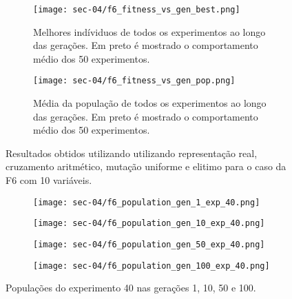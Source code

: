 \begin{figure}[htb]
	\begin{subfigure}{.45\textwidth}
		\centering
		\texttt{[image: sec-04/f6\_fitness\_vs\_gen\_best.png]}
		\caption{Melhores indíviduos de todos os experimentos ao longo das gerações.
		Em preto é mostrado o comportamento médio dos 50 experimentos. }
	\end{subfigure}
	\hfill
	\begin{subfigure}{.45\textwidth}
		\centering
		\texttt{[image: sec-04/f6\_fitness\_vs\_gen\_pop.png]}
		\caption{Média da população de todos os experimentos ao longo das gerações.
		Em preto é mostrado o comportamento médio dos 50 experimentos.}
	\end{subfigure}
	\caption{Resultados obtidos utilizando utilizando representação real, cruzamento aritmético,
    mutação uniforme e elitimo para o caso da F6 com 10 variáveis.}
\end{figure}

\begin{figure}[htb]
	\begin{subfigure}{.5\textwidth}
		\centering
		\texttt{[image: sec-04/f6\_population\_gen\_1\_exp\_40.png]}
	  \end{subfigure}
	  \begin{subfigure}{.5\textwidth}
		\centering
		\texttt{[image: sec-04/f6\_population\_gen\_10\_exp\_40.png]}
	  \end{subfigure}
	  \begin{subfigure}{.5\textwidth}
		\centering
		\texttt{[image: sec-04/f6\_population\_gen\_50\_exp\_40.png]}
	  \end{subfigure}
	  \begin{subfigure}{.5\textwidth}
		\centering
		\texttt{[image: sec-04/f6\_population\_gen\_100\_exp\_40.png]}
	  \end{subfigure}
	\caption{Populações do experimento 40 nas gerações 1, 10, 50 e 100.}
	\end{figure}